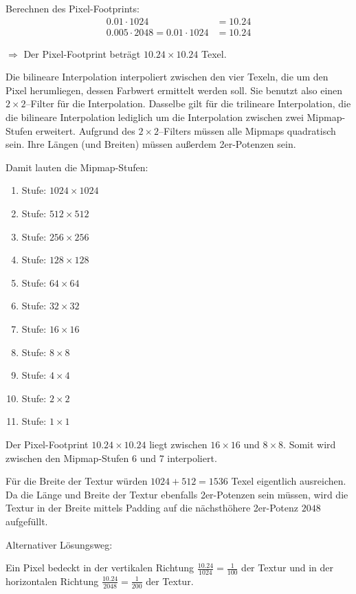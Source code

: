 \documentclass[a4paper]{scrartcl}
\begin{document}
Berechnen des Pixel-Footprints:
\begin{align}
    0.01 \cdot 1024 &= 10.24\\
    0.005 \cdot 2048 = 0.01 \cdot 1024 &= 10.24
\end{align}

$\Rightarrow$ Der Pixel-Footprint beträgt $10.24 \times 10.24$ Texel.

Die bilineare Interpolation interpoliert zwischen den vier Texeln, die um den Pixel herumliegen, dessen Farbwert ermittelt werden soll. Sie benutzt also einen $2 \times 2$--Filter für die Interpolation. Dasselbe gilt für die trilineare Interpolation, die die bilineare Interpolation lediglich um die Interpolation zwischen zwei Mipmap-Stufen erweitert. Aufgrund des $2 \times 2$--Filters müssen alle Mipmaps quadratisch sein. Ihre Längen (und Breiten) müssen außerdem 2er-Potenzen sein.

Damit lauten die Mipmap-Stufen:
\begin{enumerate}[start=0]
    \item Stufe: $1024 \times 1024$
    \item Stufe: $512 \times 512$
    \item Stufe: $256 \times 256$
    \item Stufe: $128 \times 128$
    \item Stufe: $64 \times 64$
    \item Stufe: $32 \times 32$
    \item Stufe: $16 \times 16$
    \item Stufe: $8 \times 8$
    \item Stufe: $4 \times 4$
    \item Stufe: $2 \times 2$
    \item Stufe: $1 \times 1$
\end{enumerate}

Der Pixel-Footprint $10.24 \times 10.24$ liegt zwischen $16 \times 16$ und $8 \times 8$. Somit wird zwischen den Mipmap-Stufen 6 und 7 interpoliert.

Für die Breite der Textur würden $1024 + 512 = 1536$ Texel eigentlich ausreichen. Da die Länge und Breite der Textur ebenfalls 2er-Potenzen sein müssen, wird die Textur in der Breite mittels Padding auf die nächsthöhere 2er-Potenz $2048$ aufgefüllt.

Alternativer Lösungsweg:

Ein Pixel bedeckt in der vertikalen Richtung $\frac{10.24}{1024} = \frac{1}{100}$ der Textur und in der horizontalen Richtung $\frac{10.24}{2048} = \frac{1}{200}$ der Textur.
\end{document}
